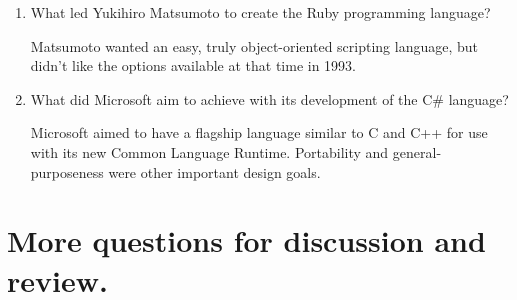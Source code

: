 \begin{enumerate}
  \item What led Yukihiro Matsumoto to create the Ruby programming language?

  \begin{answer}

    Matsumoto wanted an easy, truly object-oriented scripting language, but
    didn't like the options available at that time in 1993.

    \end{answer}

  \item What did Microsoft aim to achieve with its development of the
    C\# language?

  \begin{answer}

    Microsoft aimed to have a flagship language similar to C and C++ for use
    with its new Common Language Runtime. Portability and general-purposeness
    were other important design goals.

    \end{answer}

  \end{enumerate}

\section{More questions for discussion and review.}

